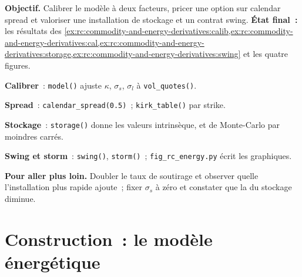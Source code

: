 \begin{tutorial}
\textbf{Objectif.} Calibrer le modèle à deux facteurs, pricer une option sur calendar spread et valoriser une
installation de stockage et un contrat swing. \textbf{État final~:} les résultats des
\cref{ex:rc:commodity-and-energy-derivatives:calib,ex:rc:commodity-and-energy-derivatives:cal,ex:rc:commodity-and-energy-derivatives:storage,ex:rc:commodity-and-energy-derivatives:swing}
et les quatre figures.
\begin{tutsteps}
\item \textbf{Calibrer}~: \texttt{model()} ajuste $\kappa$, $\sigma_s$, $\sigma_l$ à
\texttt{vol\_quotes()}.
\item \textbf{Spread}~: \texttt{calendar\_spread(0.5)}~; \texttt{kirk\_table()} par strike.
\item \textbf{Stockage}~: \texttt{storage()} donne les valeurs intrinsèque,  et
de Monte-Carlo par moindres carrés.
\item \textbf{Swing et storm}~: \texttt{swing()}, \texttt{storm()}~;
\texttt{fig\_rc\_energy.py} écrit les graphiques.
\end{tutsteps}
\textbf{Pour aller plus loin.} Doubler le taux de soutirage et observer quelle 
l'installation plus rapide ajoute~; fixer $\sigma_s$ à zéro et constater que la 
du stockage diminue.
\end{tutorial}

\section{Construction~: le modèle énergétique}\label{bld:rc:commodity-and-energy-derivatives:energymodel}

